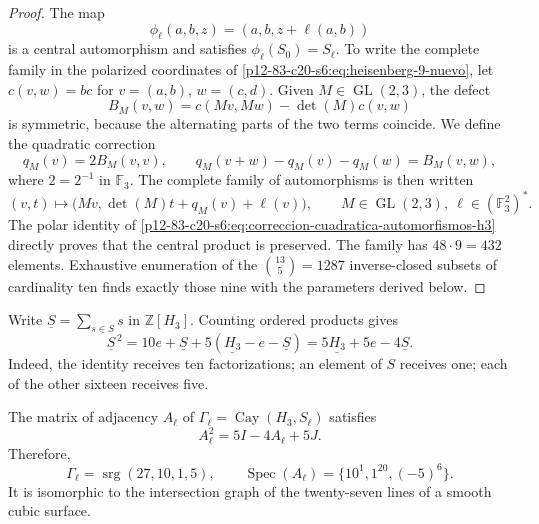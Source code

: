 \begin{proof}
The map
\[
 \phi_\ell(a,b,z)=(a,b,z+\ell(a,b))
\]
is a central automorphism and satisfies
\(\phi_\ell(S_0)=S_\ell\). To write the complete family in the
polarized coordinates of \cref{p12-83-c20-s6:eq:heisenberg-9-nuevo}, let
\(c(v,w)=b c\) for \(v=(a,b)\), \(w=(c,d)\). Given
\(M\in\operatorname{GL}(2,3)\), the defect
\[
 B_M(v,w)=c(Mv,Mw)-\det(M)c(v,w)
\]
is symmetric, because the alternating parts of the two terms coincide. We define the quadratic correction
\begin{equation}
 q_M(v)=2B_M(v,v),
 \qquad
 q_M(v+w)-q_M(v)-q_M(w)=B_M(v,w),
 \label{p12-83-c20-s6:eq:correccion-cuadratica-automorfismos-h3}
\end{equation}
where \(2=2^{-1}\) in \(\mathbb F_3\). The complete family of
automorphisms is then written
\begin{equation}
 (v,t)\longmapsto
 \bigl(Mv,\det(M)t+q_M(v)+\ell(v)\bigr),
 \qquad M\in\operatorname{GL}(2,3),\
 \ell\in(\mathbb F_3^2)^*.
 \label{p12-83-c20-s6:eq:automorfismos-h3-completos}
\end{equation}
The polar identity of \cref{p12-83-c20-s6:eq:correccion-cuadratica-automorfismos-h3}
directly proves that the central product is preserved. The family has
\(48\cdot9=432\) elements. Exhaustive enumeration of the
\(\binom{13}{5}=1287\) inverse-closed subsets of cardinality ten
finds exactly those nine with the parameters derived
below.
\end{proof}

Write \(\underline S=\sum_{s\in S}s\) in
\(\mathbb Z[H_3]\). Counting ordered products gives
\begin{equation}
 \underline S^{\,2}
 =10e+\underline S+5(\underline{H_3}-e-\underline S)
 =5\underline{H_3}+5e-4\underline S.
 \label{p12-83-c20-s6:eq:identidad-grupo-schlafli-nueva}
\end{equation}
Indeed, the identity receives ten factorizations; an element of
\(S\) receives one; each of the other sixteen receives five.

\begin{theorem}
\label{p12-83-c20-s6:thm:grafo-27-rectas-nuevo}
The matrix of adjacency \(A_\ell\) of
\(\Gamma_\ell=\operatorname{Cay}(H_3,S_\ell)\) satisfies
\begin{equation}
 A_\ell^2=5I-4A_\ell+5J.
 \label{p12-83-c20-s6:eq:identidad-schlafli-nueva}
\end{equation}
Therefore,
\[
 \Gamma_\ell=\operatorname{srg}(27,10,1,5),
 \qquad
 \operatorname{Spec}(A_\ell)=\{10^1,1^{20},(-5)^6\}.
\]
It is isomorphic to the intersection graph of the twenty-seven lines of a
smooth cubic surface.
\end{theorem}

